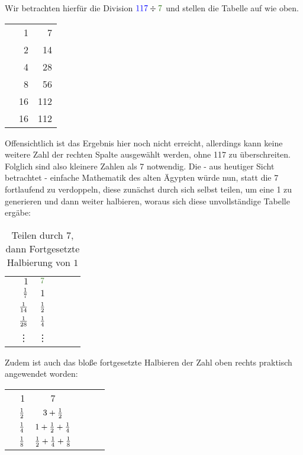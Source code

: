 	\begin{bsp}
		Wir betrachten hierfür die Division $\textcolor{blue}{117} \div \textcolor{OliveGreen}{7}$ und stellen die Tabelle auf wie oben.
		\begin{center}
			\begin{tabular}{r r r}
				& 1 & \textcolor{OliveGreen}{7}\\
				& 2 & 14\\
				& 4 & 28\\
				& 8 & 56\\
				\checkmark & 16 & 112\\ \hline
				\ding{53}& 16 & 112
			\end{tabular}
		\end{center}
		Offensichtlich ist das Ergebnis hier noch nicht erreicht, allerdings kann keine weitere Zahl der rechten Spalte ausgewählt werden, ohne 117 zu überschreiten. Folglich sind also kleinere Zahlen als 7 notwendig. Die - aus heutiger Sicht betrachtet - einfache Mathematik des alten Ägypten würde nun, statt die 7 fortlaufend zu verdoppeln, diese zunächst durch sich selbst teilen, um eine 1 zu generieren und dann weiter halbieren, woraus sich diese unvollständige Tabelle ergäbe:~\\
		\begin{table}[H]
			\centering
			\begin{tabular}{Sr Sr Sr}
				& $1$ & $\textcolor{OliveGreen}{7}$\\
				& $\frac{1}{7}$ & $1$\\
				& $\frac{1}{14}$ & $\frac{1}{2}$\\
				& $\frac{1}{28}$ & $\frac{1}{4}$\\
				& \vdots & \vdots \\
			\end{tabular}
		\caption{Teilen durch $7$, dann Fortgesetzte Halbierung von $1$}
		\label{table:Division_HalbEins}
		\end{table}
		Zudem ist auch das bloße fortgesetzte Halbieren der Zahl oben rechts praktisch angewendet worden:~	
		\begin{table}[H]
			\centering
			\begin{tabular}[h]{Sr Sr Sr}
				& 1 & \textcolor{OliveGreen}{7}\\
				& $\frac{1}{2}$ & $3+\frac{1}{2}$\\
				& $\frac{1}{4}$ & $1+\frac{1}{2}+\frac{1}{4}$\\
				& $\frac{1}{8}$ & $\frac{1}{2}+\frac{1}{4}+\frac{1}{8}$\\

\end{tabular}
\end{table}
\end{bsp}
